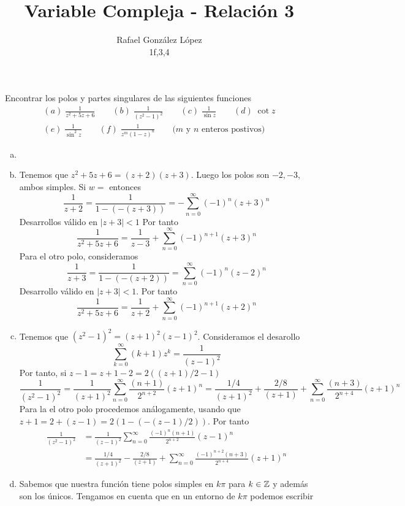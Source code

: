 \documentclass[twoside]{article}
\begin{document}
\title{Variable Compleja - Relación 3}
\author{Rafael González López\\
1f,3,4}
\maketitle
\begin{ejercicio}{1}
Encontrar los polos y partes singulares de las siguientes funciones
\begin{gather*}
(a)\; \frac{1}{z^2+5z+6} \qquad (b)\; \frac{1}{(z^2-1)^2} \qquad (c)\; \frac{1}{\sin z} \qquad (d)\; \cot z\\
(e)\; \frac{1}{\sin^2 z}\qquad (f)\; \frac{1}{z^m(1-z)^n} \qquad\text{($m$ y $n$ enteros postivos)}
\end{gather*}
\end{ejercicio}
\begin{solucion}
\begin{enumerate}[(a)]
\item[]
\item Tenemos que $z^2+5z+6=(z+2)(z+3)$. Luego los polos son $-2,-3$, ambos simples. Si $w=$ entonces
$$
\frac{1}{z+2}=\frac{1}{1-(-(z+3))} = - \sum_{n=0}^\infty (-1)^n(z+3)^n
$$
Desarrollos válido en $|z+3|<1$ Por tanto
$$
\frac{1}{z^2+5z+6} = \frac{1}{z-3} + \sum_{n=0}^\infty (-1)^{n+1}(z+3)^n
$$
Para el otro polo, consideramos
$$
\frac{1}{z+3} = \frac{1}{1-(-(z+2))} = \sum_{n=0}^\infty (-1)^n(z-2)^n
$$
Desarrollo válido en $|z+3|<1$. Por tanto
$$
\frac{1}{z^2+5z+6} = \frac{1}{z+2} + \sum_{n=0}^\infty (-1)^{n+1}(z+2)^n
$$
\newpage
\item Tenemos que $(z^2-1)^2 = (z+1)^2(z-1)^2$. Consideramos el desarollo
$$
\sum_{k=0}^\infty (k+1)z^k = \frac{1}{(z-1)^2}
$$
Por tanto, si $z-1 = z+1 -2 = {2((z+1)/2-1)}$
$$\frac{1}{(z^2-1)^2}=  \frac{1}{(z+1)^2} \sum_{n=0}^\infty\frac{(n+1)}{2^{n+2}}(z+1)^n = \frac{1/4}{(z+1)^{2}}+\frac{2/8}{(z+1)} + \sum_{n=0}^\infty \frac{(n+3)}{2^{n+4}}(z+1)^{n} 
$$
Para la el otro polo procedemos análogamente, usando que $z+1=2+(z-1) = 2(1-(-(z-1)/2))$. Por tanto
\begin{align*}
\frac{1}{(z^2-1)^2}&=  \frac{1}{(z-1)^2} \sum_{n=0}^\infty\frac{(-1)^n(n+1)}{2^{n+2}}(z-1)^n\\
&= \frac{1/4}{(z+1)^{2}}-\frac{2/8}{(z+1)} + \sum_{n=0}^\infty \frac{(-1)^{n+2}(n+3)}{2^{n+4}}(z+1)^{n}
\end{align*}
\item Sabemos que nuestra función tiene polos simples en $k\pi$ para $k\in \mathbb{Z}$ y además son los únicos.
Tengamos en cuenta que en un entorno de $k\pi$ podemos escribir

\end{enumerate}
\end{solucion}
\end{document}
